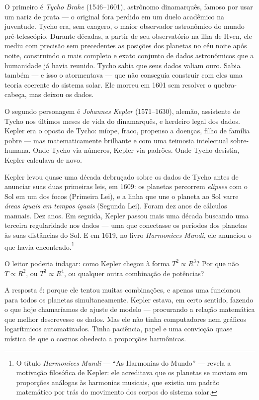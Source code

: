 O primeiro é \textit{Tycho Brahe} (1546--1601), astrônomo dinamarquês, famoso por usar
um nariz de prata --- o original fora perdido em um duelo acadêmico na juventude. Tycho
era, sem exagero, o maior observador astronômico do mundo pré-telescópio. Durante
décadas, a partir de seu observatório na ilha de Hven, ele mediu com precisão sem
precedentes as posições dos planetas no céu noite após noite, construindo o mais completo
e exato conjunto de dados astronômicos que a humanidade já havia reunido. Tycho sabia que
seus dados valiam ouro. Sabia também --- e isso o atormentava --- que não conseguia
construir com eles uma teoria coerente do sistema solar. Ele morreu em 1601 sem resolver
o quebra-cabeça, mas deixou os dados.
 
O segundo personagem é \textit{Johannes Kepler} (1571--1630), alemão, assistente de
Tycho nos últimos meses de vida do dinamarquês, e herdeiro legal dos dados. Kepler era o
oposto de Tycho: míope, fraco, propenso a doenças, filho de família pobre --- mas
matematicamente brilhante e com uma teimosia intelectual sobre-humana. Onde Tycho via
números, Kepler via padrões. Onde Tycho desistia, Kepler calculava de novo.
 
Kepler levou quase uma década debruçado sobre os dados de Tycho antes de anunciar suas
duas primeiras leis, em 1609: os planetas percorrem \textit{elipses} com o Sol em um dos
focos (Primeira Lei), e a linha que une o planeta ao Sol varre \textit{áreas iguais em
tempos iguais} (Segunda Lei). Foram dez anos de cálculos manuais. Dez anos. Em seguida,
Kepler passou mais uma década buscando uma terceira regularidade nos dados --- uma que
conectasse os períodos dos planetas às suas distâncias do Sol. E em 1619, no livro
\textit{Harmonices Mundi}, ele anunciou o que havia encontrado.\footnote{O título
\textit{Harmonices Mundi} --- ``As Harmonias do Mundo'' --- revela a motivação filosófica
de Kepler: ele acreditava que os planetas se moviam em proporções análogas às harmonias
musicais, que existia um padrão matemático por trás do movimento dos corpos do sistema solar.}
 
 
O leitor poderia indagar: como Kepler chegou à forma $T^2 \propto R^3$? Por que não
$T \propto R^2$, ou $T^3 \propto R^4$, ou qualquer outra combinação de potências?
 
A resposta é: porque ele tentou muitas combinações, e apenas uma funcionou para todos
os planetas simultaneamente. Kepler estava, em certo sentido, fazendo o que hoje
chamaríamos de ajuste de modelo --- procurando a relação matemática que melhor
descrevesse os dados. Mas ele não tinha computadores nem gráficos logarítmicos
automatizados. Tinha paciência, papel e uma convicção quase mística de que o cosmos
obedecia a proporções harmônicas.
 
